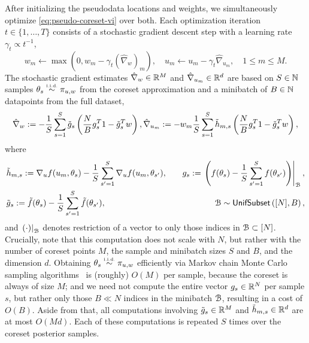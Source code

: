 After initializing the pseudodata locations and weights,
we simultaneously optimize \cref{eq:pseudo-coreset-vi} over both.
Each optimization iteration $t\in \{1, \dots, T\}$ consists of a stochastic gradient descent step
with a learning rate $\gamma_t \propto t^{-1}$,  
\[
w_m \gets \max\left(0, w_m - \gamma_t (\hat\nabla_{w})_m\right),
\quad u_m \gets u_{m} - \gamma_t \hat\nabla_{u_{m}},
\quad 1\leq m \leq M.
\label{eq:gd-update}
\]
The stochastic gradient estimates $\hat\nabla_w \in \mathbb{R}^M$ and $\hat\nabla_{u_m} \in \mathbb{R}^d$
are based on $S\in\mathbb{N}$ samples $\theta_s \distiid \pi_{u,w}$ from the coreset approximation
and a minibatch of $B\in\mathbb{N}$ datapoints from the full dataset,
\[
\hat\nabla_w := -\frac{1}{S}\sum_{s=1}^{S} \tilde{g}_s \left(\frac{N}{B}g_s^T 1  -  \tilde{g}_s^Tw  \right) \label{eq:weight-optimization-mc}, \quad \\
\hat\nabla_{u_m} := - w_m \frac{1}{S}\sum_{s=1}^{S} \tilde{h}_{m,s}  \left(\frac{N}{B}g_s^T 1 - \tilde{g}_s^T w \right), \label{eq:location-optimization-mc-cov}
\]
where
\[
\begin{aligned}
& \tilde{h}_{m,s} :=\nabla_u f(u_m, \theta_s) - \frac{1}{S} \sum_{s'=1}^{S}\nabla_u f(u_m, \theta_{s'}),
\quad & g_s := \left. \left(f(\theta_s) - \frac{1}{S} \sum_{s'=1}^{S} f(\theta_{s'})\right)\right|_{\mathcal{B}},\\
& \tilde{g}_s := \tilde{f}(\theta_s) - \frac{1}{S} \sum_{s'=1}^{S} \tilde{f}(\theta_{s'}),
\quad & \mathcal{B} \sim {\sf{UnifSubset}}\left([N], B\right),
\end{aligned}\label{eq:gradparts}
\] 
and $\left.(\cdot)\right|_{\mathcal{B}}$ denotes restriction of a vector to only those indices in $\mathcal{B}\subset[N]$.
Crucially, note that this computation does not scale with $N$, but rather with the number
of coreset points $M$, the sample and minibatch sizes $S$ and $B$, and the dimension $d$.
Obtaining $\theta_s\distiid \pi_{u,w}$ efficiently via Markov chain Monte Carlo sampling
algorithms~\citep{hoffman14,jacob17} is (roughly) $O(M)$ per sample, because the coreset is always of size $M$;
and we need not compute
the entire vector $g_s\in\mathbb{R}^N$ per sample $s$, but rather only those $B\ll N$ indices in the minibatch $\mathcal{B}$,
resulting in a cost of $O(B)$.
Aside from that, all computations involving $\tilde{g}_s\in\mathbb{R}^M$ and $\tilde{h}_{m,s}\in\mathbb{R}^d$ are at most $O(Md)$.
Each of these computations is repeated $S$ times over the coreset posterior samples.





